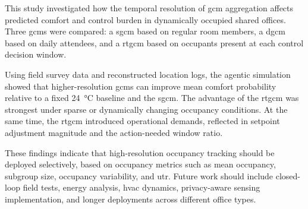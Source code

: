 This study investigated how the temporal resolution of \ac{gcm} aggregation affects predicted comfort and control burden in dynamically occupied shared offices.
Three \acp{gcm} were compared: a \ac{sgcm} based on regular room members, a \ac{dgcm} based on daily attendees, and a \ac{rtgcm} based on occupants present at each control decision window.

Using field survey data and reconstructed location logs, the agentic simulation showed that higher-resolution \acp{gcm} can improve mean comfort probability relative to a fixed \qty{24}{\celsius} baseline and the \ac{sgcm}.
The advantage of the \ac{rtgcm} was strongest under sparse or dynamically changing occupancy conditions.
At the same time, the \ac{rtgcm} introduced operational demands, reflected in setpoint adjustment magnitude and the action-needed window ratio.

These findings indicate that high-resolution occupancy tracking should be deployed selectively, based on occupancy metrics such as mean occupancy, subgroup size, occupancy variability, and \ac{utr}.
Future work should include closed-loop field tests, energy analysis, \ac{hvac} dynamics, privacy-aware sensing implementation, and longer deployments across different office types.

